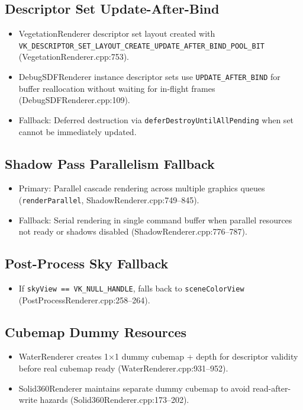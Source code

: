 \documentclass[11pt,a4paper]{article}
\begin{document}
\subsection{Descriptor Set Update-After-Bind}
\begin{itemize}
    \item VegetationRenderer descriptor set layout created with \texttt{VK\_DESCRIPTOR\_SET\_LAYOUT\_CREATE\_UPDATE\_AFTER\_BIND\_POOL\_BIT} (VegetationRenderer.cpp:753).
    \item DebugSDFRenderer instance descriptor sets use \texttt{UPDATE\_AFTER\_BIND} for buffer reallocation without waiting for in-flight frames (DebugSDFRenderer.cpp:109).
    \item Fallback: Deferred destruction via \texttt{deferDestroyUntilAllPending} when set cannot be immediately updated.
\end{itemize}

\subsection{Shadow Pass Parallelism Fallback}
\begin{itemize}
    \item Primary: Parallel cascade rendering across multiple graphics queues (\texttt{renderParallel}, ShadowRenderer.cpp:749–845).
    \item Fallback: Serial rendering in single command buffer when parallel resources not ready or shadows disabled (ShadowRenderer.cpp:776–787).
\end{itemize}

\subsection{Post-Process Sky Fallback}
\begin{itemize}
    \item If \texttt{skyView == VK\_NULL\_HANDLE}, falls back to \texttt{sceneColorView} (PostProcessRenderer.cpp:258–264).
\end{itemize}

\subsection{Cubemap Dummy Resources}
\begin{itemize}
    \item WaterRenderer creates 1×1 dummy cubemap + depth for descriptor validity before real cubemap ready (WaterRenderer.cpp:931–952).
    \item Solid360Renderer maintains separate dummy cubemap to avoid read-after-write hazards (Solid360Renderer.cpp:173–202).
\end{itemize}
\end{document}
